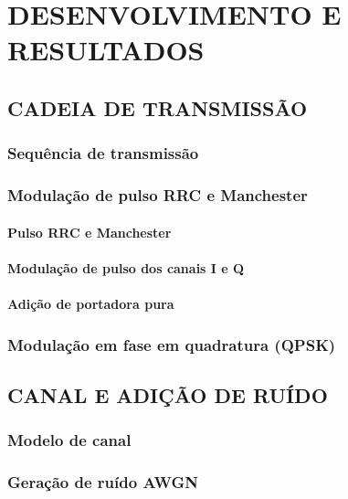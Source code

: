 \chapter{DESENVOLVIMENTO E RESULTADOS}\label{cap:desenvolvimento}

\section{CADEIA DE TRANSMISSÃO}\label{sec:transmissao}

\subsection{Sequência de transmissão}\label{sec:geracao_bits}

\subsection{Modulação de pulso RRC e Manchester}

\subsubsection{Pulso RRC e Manchester}

\subsubsection{Modulação de pulso dos canais I e Q}

\subsubsection{Adição de portadora pura}

\subsection{Modulação em fase em quadratura (QPSK)}\label{sec:qpsk}

\section{CANAL E ADIÇÃO DE RUÍDO}\label{sec:canal}

\subsection{Modelo de canal}\label{sec:modelo_canal}

\subsection{Geração de ruído AWGN}\label{sec:geracao_ruido}

